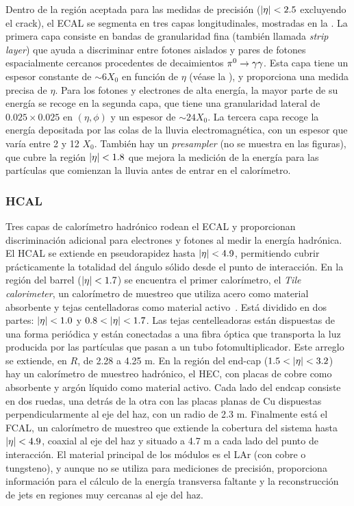 Dentro de la región aceptada para las medidas de precisión (\(|\eta|<2.5\) excluyendo el crack), el \ac{ECAL} se segmenta en tres capas longitudinales, mostradas en la \Fig{\ref{fig:atlas:atlas:cals:ecal:ecal_cells}}.
La primera capa consiste en bandas de granularidad fina (también llamada \textit{strip layer}) que ayuda a discriminar entre fotones aislados y pares de fotones espacialmente cercanos procedentes de decaimientos \(\pi^{0}\rightarrow\gamma\gamma\). Esta capa tiene un espesor constante de \(\sim 6 X_0\) en función de \(\eta\) (véase la \Fig{\ref{fig:atlas:atlas:cals:ecal:ecal_radiation_length}}), y proporciona una medida precisa de \(\eta\).
Para los fotones y electrones de alta energía, la mayor parte de su energía se recoge en la segunda capa, que tiene una granularidad lateral de \(0.025 \times 0.025\) en \((\eta, \phi)\) y un espesor de \(\sim 24 X_0\).
La tercera capa recoge la energía depositada por las colas de la lluvia electromagnética, con un espesor que varía entre 2 y 12 \(X_0\).
También hay un \textit{presampler} (no se muestra en las figuras), que cubre la región \(|\eta|<1.8\) que mejora la medición de la energía para las partículas que comienzan la lluvia antes de entrar en el calorímetro.




\subsubsection{\acf{HCAL}}



Tres capas de calorímetro hadrónico rodean el \ac{ECAL} y proporcionan discriminación adicional para electrones y fotones al medir la energía hadrónica. El \ac{HCAL} se extiende en pseudorapidez hasta \(|\eta|<4.9\), permitiendo cubrir prácticamente la totalidad del ángulo sólido desde el punto de interacción. En la región del barrel (\(|\eta|<1.7\)) se encuentra el primer calorímetro, el \textit{Tile calorimeter}, un calorímetro de muestreo que utiliza acero como material absorbente y tejas centelladoras como material activo~\cite{ATLAS-Tile-TDR}. Está dividido en dos partes: \(|\eta|<1.0\) y \(0.8<\abseta<1.7\). Las tejas centelleadoras están dispuestas de una forma periódica y están conectadas a una fibra óptica que transporta la luz producida por las partículas que pasan a un tubo fotomultiplicador. Este arreglo se extiende, en \(R\), de 2.28 a 4.25 m. En la región del end-cap (\(1.5<\abseta<3.2\)) hay un calorímetro de muestreo hadrónico, el \acf{HEC}, con placas de cobre como absorbente y argón líquido como material activo. Cada lado del endcap consiste en dos ruedas, una detrás de la otra con las placas planas de Cu dispuestas perpendicularmente al eje del haz, con un radio de 2.3 m. Finalmente está el \ac{FCAL}, un calorímetro de muestreo que extiende la cobertura del sistema hasta \(|\eta|<4.9\), coaxial al eje del haz y situado a 4.7 m a cada lado del punto de interacción. El material principal de los módulos es el \ac{LAr} (con cobre o tungsteno), y aunque no se utiliza para mediciones de precisión, proporciona información para el cálculo de la energía transversa faltante y la reconstrucción de jets en regiones muy cercanas al eje del haz.

